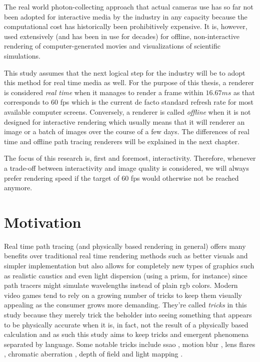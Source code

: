 \documentclass[
  twoside,
  11pt, a4paper,
  footinclude=true,
  headinclude=true,
  cleardoublepage=empty
]{scrreprt}
\begin{document}
The real world photon-collecting approach that actual cameras use has so far not been adopted for
interactive media by the industry in any capacity because the computational cost has historically
been prohibitively expensive. It is, however, used extensively (and has been in use for decades)
for offline, non-interactive rendering of computer-generated movies and visualizations of
scientific simulations.

This study assumes that the next logical step for the industry will be to adopt this method for
real time media as well. For the purpose of this thesis, a renderer is considered
\textit{real time} when it manages to render a frame within \(16.67ms\) as that corresponds to 60
\ac{fps} which is
the current de facto standard refresh rate for most available computer screens. Conversely, a
renderer is called \textit{offline} when it is not designed for interactive rendering which usually
means that it will renderer an image or a batch of images over the course of a few days. The
differences of real time and offline path tracing renderers will be explained in the next chapter.

The focus of this research is, first and foremost, interactivity. Therefore, whenever a trade-off between
interactivity and image quality is considered, we will always prefer rendering speed if the target
of 60 \ac{fps} would otherwise not be reached anymore.

\section{Motivation}
Real time path tracing (and physically based rendering in general) offers many
benefits over traditional real time rendering methods such as better visuals
and simpler implementation but also allows for completely new types of graphics
such as realistic caustics \cite{wiki:caustics} and even light dispersion
\cite{wiki:dispersion} (using a prism, for instance) since path tracers might simulate wavelengths
instead of plain \ac{rgb} colors. Modern video games tend
to rely on a growing number of tricks to keep them visually appealing as the
consumer grows more demanding. They're called \textit{tricks} in this study
because they merely trick the beholder into seeing something that appears to be
physically accurate when it is, in fact, not the result of a physically based
calculation and as such this study aims to keep tricks and emergent phenomena
separated by language. Some notable tricks include \ac{ssao}
\cite{wiki:ssao}, motion blur \cite{wiki:motion-blur}, lens flares
\cite{wiki:lens-flare}, chromatic aberration \cite{wiki:chromatic-aberration},
depth of field \cite{wiki:depth-of-field} and light mapping \cite{wiki:lightmap}.
\end{document}
